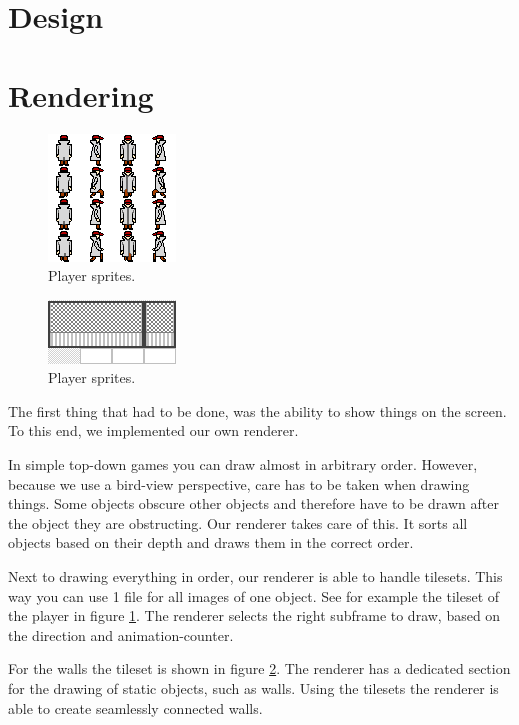 \documentclass[a4paper,pdf,12pt]{article}
\begin{document}
\section{Design}
\label{sec:Design}


\section{Rendering}
\label{sec:Rendering}

\begin{figure}
\centering
\includegraphics{../img/player.png}
\caption{Player sprites.}
\label{fig:player}
\end{figure}

\begin{figure}
\centering
\includegraphics{../img/ground_test.png}
\caption{Player sprites.}
\label{fig:walls}
\end{figure}


The first thing that had to be done, was the ability to show things on the screen. To this end, we implemented our own renderer.

In simple top-down games you can draw almost in arbitrary order. However, because we use a bird-view perspective, care has to be taken when drawing things. Some objects obscure other objects and therefore have to be drawn after the object they are obstructing. Our renderer takes care of this. It sorts all objects based on their depth and draws them in the correct order.

Next to drawing everything in order, our renderer is able to handle tilesets. This way you can use 1 file for all images of one object. See for example the tileset of the player in figure \ref{fig:player}. The renderer selects the right subframe to draw, based on the direction and animation-counter.

For the walls the tileset is shown in figure \ref{fig:walls}. The renderer has a dedicated section for the drawing of static objects, such as walls. Using the tilesets the renderer is able to create seamlessly connected walls.
\end{document}
